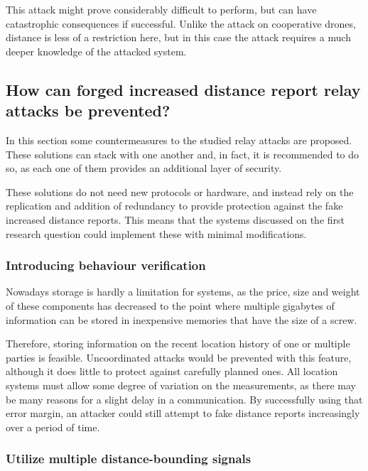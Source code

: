 \documentclass{article}
\begin{document}
\begin{description}
This attack might prove considerably difficult to perform, but can have catastrophic consequences if successful. Unlike the attack on cooperative drones, distance is less of a restriction here, but in this case the attack requires a much deeper knowledge of the attacked system.

\end{description}


\subsection{How can forged increased distance report relay attacks be prevented?}

In this section some countermeasures to the studied relay attacks are proposed. These solutions can stack with one another and, in fact, it is recommended to do so, as each one of them provides an additional layer of security.

These solutions do not need new protocols or hardware, and instead rely on the replication and addition of redundancy to provide protection against the fake increased distance reports. This means that the systems discussed on the first research question could implement these with minimal modifications.

\subsubsection{Introducing behaviour verification}

Nowadays storage is hardly a limitation for systems, as the price, size and weight of these components has decreased to the point where multiple gigabytes of information can be stored in inexpensive memories that have the size of a screw.

Therefore, storing information on the recent location history of one or multiple parties is feasible. Uncoordinated attacks would be prevented with this feature, although it does little to protect against carefully planned ones. All location systems must allow some degree of variation on the measurements, as there may be many reasons for a slight delay in a communication. By successfully using that error margin, an attacker could still attempt to fake distance reports increasingly over a period of time.



\subsubsection{Utilize multiple distance-bounding signals}
\end{document}
